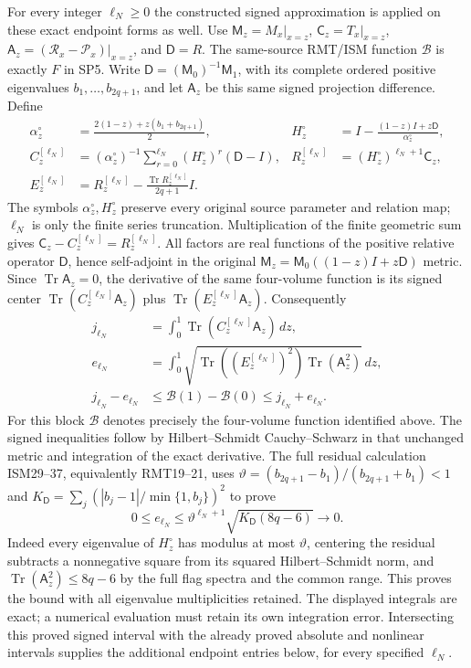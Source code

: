 For every integer $\ell_N\ge0$ the constructed signed approximation
is applied on these exact endpoint forms as well. Use $\mathsf M_z=M_x|_{x=z}$,
$\mathsf C_z=T_x|_{x=z}$,
$\mathsf A_z=(\mathcal R_x-\mathcal P_x)|_{x=z}$,
and $\mathsf D=R$. The same-source RMT/ISM function $\mathcal B$
is exactly $F$ in SP5.
Write $\mathsf D=(\mathsf M_0)^{-1}\mathsf M_1$, with its complete
ordered positive eigenvalues $b_1,\ldots,b_{2q+1}$, and let
$\mathsf A_z$ be this same signed projection difference. Define
\[
 \begin{aligned}
 \alpha_z^\circ&=\frac{2(1-z)+z(b_1+b_{2q+1})}{2},&
 H_z^\circ&=I-\frac{(1-z)I+z\mathsf D}{\alpha_z^\circ},\\
 C_z^{[\ell_N]}&=(\alpha_z^\circ)^{-1}
       \sum_{r=0}^{\ell_N}(H_z^\circ)^r(\mathsf D-I),&
 R_z^{[\ell_N]}&=(H_z^\circ)^{\ell_N+1}\mathsf C_z,\\
 E_z^{[\ell_N]}&=R_z^{[\ell_N]}
          -\frac{\operatorname{Tr}R_z^{[\ell_N]}}{2q+1}I .
 \end{aligned}
 \tag{SP13ea}
\]
The symbols $\alpha_z^\circ,H_z^\circ$ preserve every original
source parameter and relation map; $\ell_N$ is only the finite
series truncation. Multiplication of the finite geometric sum
gives $\mathsf C_z-C_z^{[\ell_N]}=R_z^{[\ell_N]}$.
All factors are real functions of the positive relative
operator $\mathsf D$, hence self-adjoint in the original
$\mathsf M_z=\mathsf M_0((1-z)I+z\mathsf D)$ metric.
Since $\operatorname{Tr}\mathsf A_z=0$, the derivative of the same
four-volume function is its signed center
$\operatorname{Tr}(C_z^{[\ell_N]}\mathsf A_z)$ plus
$\operatorname{Tr}(E_z^{[\ell_N]}\mathsf A_z)$.
Consequently
\[
 \begin{aligned}
 j_{\ell_N}&=\int_0^1
       \operatorname{Tr}(C_z^{[\ell_N]}\mathsf A_z)\,dz,\\
 e_{\ell_N}&=\int_0^1
       \sqrt{\operatorname{Tr}((E_z^{[\ell_N]})^2)
                     \operatorname{Tr}(\mathsf A_z^2)}\,dz,\\
 j_{\ell_N}-e_{\ell_N}
 &\le\mathcal B(1)-\mathcal B(0)\le j_{\ell_N}+e_{\ell_N}.
 \end{aligned}
 \tag{SP13eb}
\]
For this block $\mathcal B$ denotes precisely the four-volume
function identified above. The signed inequalities follow by
Hilbert--Schmidt Cauchy--Schwarz in that unchanged metric and
integration of the exact derivative.
The full residual calculation ISM29--37, equivalently RMT19--21,
uses
$\vartheta=(b_{2q+1}-b_1)/(b_{2q+1}+b_1)<1$ and
$K_{\mathsf D}=\sum_j(|b_j-1|/\min\{1,b_j\})^2$ to prove
\[
 0\le e_{\ell_N}\le
    \vartheta^{\ell_N+1}\sqrt{K_{\mathsf D}(8q-6)}
       \longrightarrow0.
 \tag{SP13ec}
\]
Indeed every eigenvalue of $H_z^\circ$ has modulus at most
$\vartheta$, centering the residual subtracts a nonnegative square
from its squared Hilbert--Schmidt norm, and
$\operatorname{Tr}(\mathsf A_z^2)\le8q-6$ by the full flag spectra
and the common range. This proves the bound with all eigenvalue
multiplicities retained. The displayed integrals are exact; a
numerical evaluation must retain its own integration error.
Intersecting this proved signed interval with the already proved
absolute and nonlinear intervals supplies the additional endpoint
entries below, for every specified $\ell_N$.

